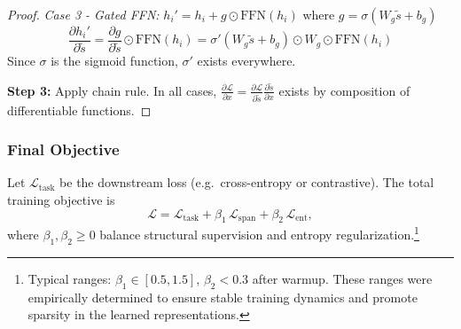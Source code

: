 \begin{proof}
	\textit{Case 3 - Gated FFN:} \(h_i' = h_i + g \odot \mathrm{FFN}(h_i)\) where \(g = \sigma(W_g \tilde{s} + b_g)\)
	\[
	\frac{\partial h_i'}{\partial \tilde{s}} = \frac{\partial g}{\partial \tilde{s}} \odot \mathrm{FFN}(h_i) = \sigma'(W_g \tilde{s} + b_g) \odot W_g \odot \mathrm{FFN}(h_i)
	\]
	Since \(\sigma\) is the sigmoid function, \(\sigma'\) exists everywhere.
	
	\textbf{Step 3:} Apply chain rule.
	In all cases, \(\frac{\partial \mathcal{L}}{\partial x} = \frac{\partial \mathcal{L}}{\partial \tilde{s}} \frac{\partial \tilde{s}}{\partial x}\) exists by composition of differentiable functions.
\end{proof}

\subsubsection{Final Objective}
Let \(\mathcal{L}_{\mathrm{task}}\) be the downstream loss (e.g.\ cross-entropy or contrastive).  The total training objective is
\[
\mathcal{L}
= \mathcal{L}_{\mathrm{task}}
+ \beta_1\,\mathcal{L}_{\mathrm{span}}
+ \beta_2\,\mathcal{L}_{\mathrm{ent}},
\]
where \(\beta_1,\beta_2\ge0\) balance structural supervision and entropy regularization.\footnote{Typical ranges: \(\beta_1\in[0.5,1.5]\), \(\beta_2<0.3\) after warmup. These ranges were empirically determined to ensure stable training dynamics and promote sparsity in the learned representations.}
